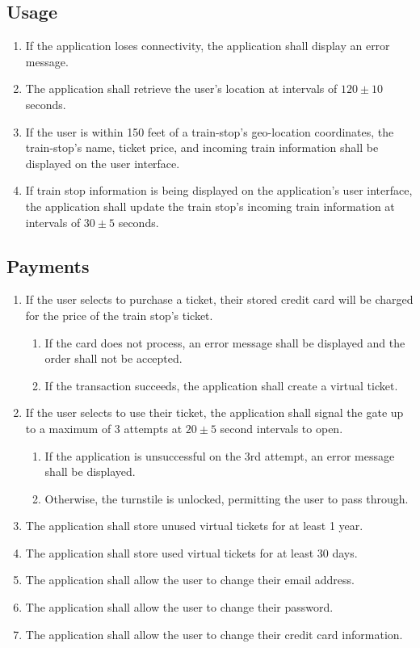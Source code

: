 	\subsection{Usage}\begin{frame}\begin{enumerate}
		\item If the application loses connectivity, the application shall display an error message. 
		\item The application shall retrieve the user’s location at intervals of $120\pm10$ seconds.
		\item If the user is within 150 feet of a train-stop’s geo-location coordinates, the train-stop’s name, ticket price, and incoming train information shall be displayed on the user interface.
		\item If train stop information is being displayed on the application’s user interface, the application shall update the train stop’s incoming train information at intervals of $30\pm 5$ seconds.
	\end{enumerate}\end{frame}
	
	\subsection{Payments}\begin{frame}\begin{enumerate}
		\item If the user selects to purchase a ticket, their stored credit card will be charged for the price of the train stop’s ticket.
		\begin{enumerate}
			\item If the card does not process, an error message shall be displayed and the order shall not be accepted.
			\item If the transaction succeeds, the application shall create a virtual ticket.
		\end{enumerate}
		\item If the user selects to use their ticket, the application shall signal the gate up to a maximum of 3 attempts at $20\pm 5$ second intervals to open.
			\begin{enumerate}
				\item If the application is unsuccessful on the 3rd attempt, an error message shall be displayed.
				\item Otherwise, the turnstile is unlocked, permitting the user to pass through.
			\end{enumerate}
		\item The application shall store unused virtual tickets for at least 1 year.
		\item The application shall store used virtual tickets for at least 30 days.
		\item The application shall allow the user to change their email address.
		\item The application shall allow the user to change their password.
		\item The application shall allow the user to change their credit card information.
	\end{enumerate}\end{frame}		
\newpage	

